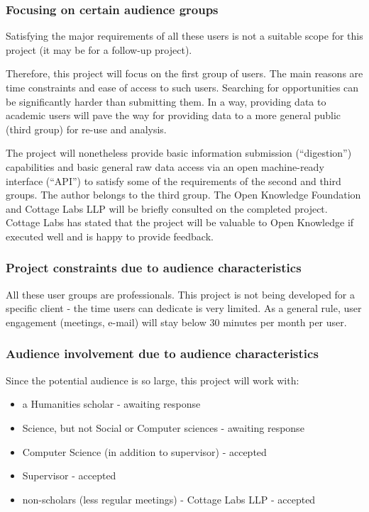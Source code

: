 \documentclass[11pt,fleqn,twoside]{article}
\begin{document}
\subsubsection{Focusing on certain audience groups}
\label{focus-groups}
Satisfying the major requirements of all these users is not a suitable scope for this project (it may be for a follow-up project).

Therefore, this project will focus on the first group of users. The main reasons are time constraints and ease of access to such users. Searching for opportunities can be significantly harder than submitting them. In a way, providing data to academic users will pave the way for providing data to a more general public (third group) for re-use and analysis.

The project will nonetheless provide basic information submission (``digestion'') capabilities and basic general raw data access via an open machine-ready interface (``API'') to satisfy some of the requirements of the second and third groups. The author belongs to the third group. The Open Knowledge Foundation \cite{okfn-vision} and Cottage Labs LLP \cite{cl} will be briefly consulted on the completed project. Cottage Labs has stated that the project will be valuable to Open Knowledge if executed well and is happy to provide feedback.

\subsubsection{Project constraints due to audience characteristics}
\label{audience-constraints}
All these user groups are professionals. This project is not being developed for a specific client - the time users can dedicate is very limited. As a general rule, user engagement (meetings, e-mail) will stay below 30 minutes per month per user.

\subsubsection{Audience involvement due to audience characteristics}
Since the potential audience is so large, this project will work with:
\begin{itemize}
	\item a Humanities scholar - awaiting response
	\item Science, but not Social or Computer sciences - awaiting response
	\item Computer Science (in addition to supervisor) - accepted
	\item Supervisor - accepted
	\item non-scholars (less regular meetings) - Cottage Labs LLP - accepted
\end{itemize}
\end{document}
